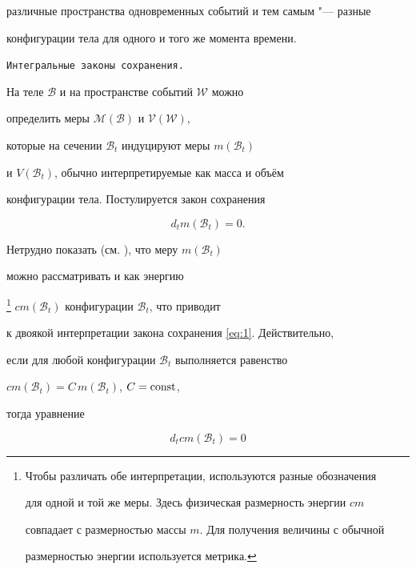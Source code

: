 различные пространства одновременных событий и тем самым "--- разные

конфигурации тела для одного и того же момента времени. 



\smallskip



{\tt Интегральные законы сохранения.}

На теле $\mathcal{B}$ и на пространстве событий $\mathcal{W}$ можно

определить меры $\mathcal{M}(\mathcal{B})$ и $\mathcal{V}(\mathcal{W})$,

которые на сечении $\mathcal{B}_{t}$ индуцируют меры $m(\mathcal{B}_{t})$

и $V(\mathcal{B}_{t})$, обычно интерпретируемые как масса и объём

конфигурации тела. Постулируется закон сохранения 

\begin{equation}

d_{t}m(\mathcal{B}_{t})=0.\label{eq:1}

\end{equation}





Нетрудно показать (см. \cite{Belevich03,Belevich08}), что меру $m(\mathcal{B}_{t})$

можно рассматривать и как энергию%

\footnote{Чтобы различать обе интерпретации, используются разные обозначения

для одной и той же меры. Здесь физическая размерность энергии $cm$

совпадает с размерностью массы $m$. Для получения величины с обычной

размерностью энергии используется метрика.%

} $cm(\mathcal{B}_{t})$ конфигурации $\mathcal{B}_{t}$, что приводит

к двоякой интерпретации закона сохранения \eqref{eq:1}. Действительно,

если для любой конфигурации $\mathcal{B}_{t}$ выполняется равенство

$cm(\mathcal{B}_{t})=C\, m(\mathcal{B}_{t})$, $C=\textnormal{const}$,

тогда уравнение

\begin{equation}

d_{t}cm(\mathcal{B}_{t})=0\label{eq:2}

\end{equation}

